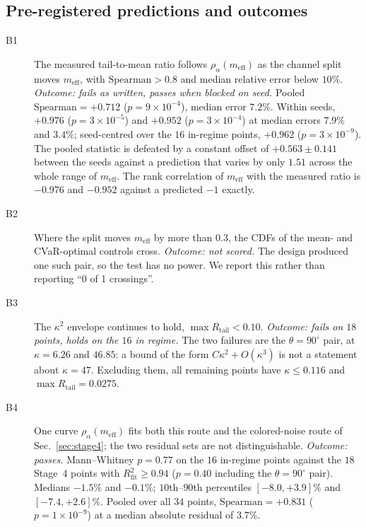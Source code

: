 \documentclass[aps,pra,onecolumn,notitlepage,superscriptaddress,nofootinbib,floatfix]{revtex4-2}
\newcommand{\Rt}{R_{\mathrm{tail}}}
\begin{document}
\subsection{Pre-registered predictions and outcomes}
\begin{description}
\item[B1] The measured tail-to-mean ratio follows
$\rho_\alpha(m_{\mathrm{eff}})$ as the channel split moves $m_{\mathrm{eff}}$,
with $\mathrm{Spearman}>0.8$ and median relative error below $10\%$.
\emph{Outcome: fails as written, passes when blocked on seed.} Pooled
$\mathrm{Spearman}=+0.712$ ($p=9\times10^{-4}$), median error $7.2\%$. Within
seeds, $+0.976$ ($p=3\times10^{-5}$) and $+0.952$ ($p=3\times10^{-4}$) at
median errors $7.9\%$ and $3.4\%$; seed-centred over the $16$ in-regime
points, $+0.962$ ($p=3\times10^{-9}$). The pooled statistic is defeated by a
constant offset of $+0.563\pm0.141$ between the seeds against a prediction
that varies by only $1.51$ across the whole range of $m_{\mathrm{eff}}$. The
rank correlation of $m_{\mathrm{eff}}$ with the measured ratio is $-0.976$ and
$-0.952$ against a predicted $-1$ exactly.
\item[B2] Where the split moves $m_{\mathrm{eff}}$ by more than $0.3$, the CDFs
of the mean- and CVaR-optimal controls cross. \emph{Outcome: not scored.} The
design produced one such pair, so the test has no power. We report this rather
than reporting ``0 of 1 crossings''.
\item[B3] The $\kappa^2$ envelope continues to hold, $\max\Rt<0.10$.
\emph{Outcome: fails on $18$ points, holds on the $16$ in regime.} The two
failures are the $\theta=90^\circ$ pair, at $\kappa=6.26$ and $46.85$: a bound
of the form $C\kappa^2+O(\kappa^3)$ is not a statement about $\kappa=47$.
Excluding them, all remaining points have $\kappa\le0.116$ and
$\max\Rt=0.0275$.
\item[B4] One curve $\rho_\alpha(m_{\mathrm{eff}})$ fits both this route and
the colored-noise route of Sec.~\ref{sec:stage4}; the two residual sets are
not distinguishable. \emph{Outcome: passes.} Mann--Whitney $p=0.77$ on the
$16$ in-regime points against the $18$ Stage~4 points with
$R^2_{\mathrm{fit}}\ge0.94$ ($p=0.40$ including the $\theta=90^\circ$ pair).
Medians $-1.5\%$ and $-0.1\%$; $10$th--$90$th percentiles $[-8.0,+3.9]\%$ and
$[-7.4,+2.6]\%$. Pooled over all $34$ points,
$\mathrm{Spearman}=+0.831$ ($p=1\times10^{-9}$) at a median absolute residual
of $3.7\%$.
\end{description}
\end{document}
